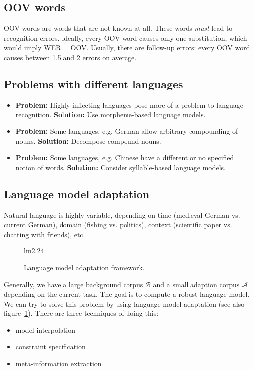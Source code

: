 \documentclass[11pt]{article}
\begin{document}
\subsection{OOV words}
OOV words are words that are not known at all. These words \textit{must} lead to recognition errors. Ideally, every OOV word causes only one substitution, which would imply WER = OOV. Usually, there are follow-up errors: every OOV word causes between 1.5 and 2 errors on average.

\subsection{Problems with different languages}
\begin{itemize}
    \item \textbf{Problem:} Highly inflecting languages pose more of a problem to language recognition. \textbf{Solution:} Use morpheme-based language models.
    \item \textbf{Problem:} Some languages, e.g. German allow arbitrary compounding of nouns. \textbf{Solution:} Decompose compound nouns.
    \item \textbf{Problem:} Some languages, e.g. Chinese have a different or no specified notion of words. \textbf{Solution:} Consider syllable-based language models.
\end{itemize}

\subsection{Language model adaptation}
Natural language is highly variable, depending on time (medieval German vs. current German), domain (fishing vs. politics), context (scientific paper vs. chatting with friends), etc.

\begin{figure}[htb]
    \begin{minipage}{\linewidth}
        \vspace{6cm}
        \hfill \scriptsize lm2.24
    \end{minipage}
    \caption{\label{fig:lmAdaptationFramework} Language model adaptation framework.}
\end{figure}

Generally, we have a large background corpus $\mathcal{B}$ and a small adaption corpus $\mathcal{A}$ depending on the current task. The goal is to compute a robust language model. We can try to solve this problem by using language model adaptation (see also figure~\ref{fig:lmAdaptationFramework}). There are three techniques of doing this:
\begin{itemize}
    \item model interpolation
    \item constraint specification
    \item meta-information extraction
\end{itemize}
\end{document}
